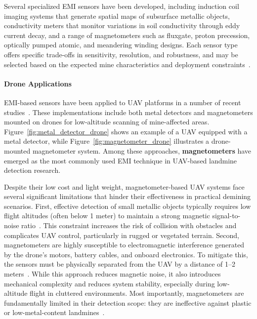 Several specialized EMI sensors have been developed, including induction coil imaging systems that generate spatial maps of subsurface metallic objects, conductivity meters that monitor variations in soil conductivity through eddy current decay, and a range of magnetometers such as fluxgate, proton precession, optically pumped atomic, and meandering winding designs. Each sensor type offers specific trade-offs in sensitivity, resolution, and robustness, and may be selected based on the expected mine characteristics and deployment constraints~\cite{Gooneratne2004ARO, Bruschini1997ASO}.

\paragraph{Drone Applications} EMI-based sensors have been applied to UAV platforms in a number of recent studies~\cite{yoo2020drone,yoo2021application,rs16162916,Yoo2024UnmannedAV}. These implementations include both metal detectors and magnetometers mounted on drones for low-altitude scanning of mine-affected areas. Figure~\ref{fig:metal_detector_drone} shows an example of a UAV equipped with a metal detector, while Figure~\ref{fig:magnetometer_drone} illustrates a drone-mounted magnetometer system. Among these approaches, \textbf{magnetometers} have emerged as the most commonly used EMI technique in UAV-based landmine detection research.

Despite their low cost and light weight, magnetometer-based UAV systems face several significant limitations that hinder their effectiveness in practical demining scenarios. First, effective detection of small metallic objects typically requires low flight altitudes (often below 1 meter) to maintain a strong magnetic signal-to-noise ratio~\cite{yoo2020drone,Yoo2024UnmannedAV}. This constraint increases the risk of collision with obstacles and complicates UAV control, particularly in rugged or vegetated terrain. Second, magnetometers are highly susceptible to electromagnetic interference generated by the drone’s motors, battery cables, and onboard electronics. To mitigate this, the sensors must be physically separated from the UAV by a distance of 1--2 meters~\cite{Yoo2024UnmannedAV,rs16162916}. While this approach reduces magnetic noise, it also introduces mechanical complexity and reduces system stability, especially during low-altitude flight in cluttered environments. Most importantly, magnetometers are fundamentally limited in their detection scope: they are ineffective against plastic or low-metal-content landmines~\cite{garcia2020airborne,vsipovs2020lightweight}.

